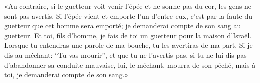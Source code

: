 «Au contraire, si le guetteur voit venir l’épée et ne sonne pas du cor,
	les gens ne sont pas avertis.
Si l’épée vient et emporte l’un d’entre eux,
	c’est par la faute du guetteur que cet homme sera emporté;
	je demanderai compte de son sang au guetteur.
Et toi, fils d’homme, je fais de toi un guetteur pour la maison d’Israël.
	Lorsque tu entendras une parole de ma bouche, tu les avertiras de ma part.
Si je dis au méchant: “Tu vas mourir”, et que tu ne l’avertis pas,
	si tu ne lui dis pas d’abandonner sa conduite mauvaise,
	lui, le méchant, mourra de son péché,
	mais à toi, je demanderai compte de son sang.»
